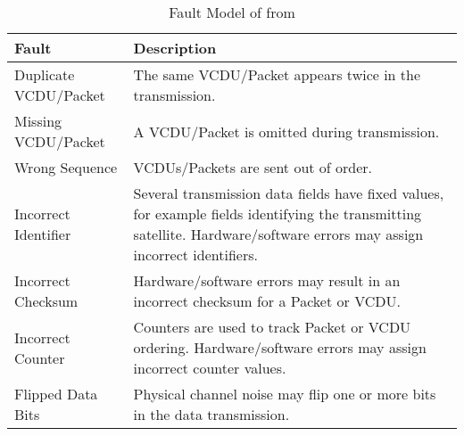 \begin{table}[h]
\begin{center}
\tiny
\begin{tabular}{|p{2.5cm}|p{5.3cm}|}
\hline
\textbf{Fault}&\textbf{Description}\\
\hline
Duplicate VCDU/Packet&The same VCDU/Packet appears twice in the transmission.\\
Missing VCDU/Packet& A VCDU/Packet is omitted during transmission.\\
Wrong Sequence& VCDUs/Packets are sent out of order. \\
Incorrect Identifier& Several transmission data fields have fixed values, for example fields identifying the transmitting satellite. Hardware/software errors may assign incorrect identifiers.\\
Incorrect Checksum& Hardware/software errors may result in an incorrect checksum for a Packet or VCDU.\\
Incorrect Counter& Counters are used to track Packet or VCDU ordering. Hardware/software errors may assign incorrect counter values.\\
Flipped Data Bits& Physical channel noise may flip one or more bits in the data transmission.\\
\hline
\end{tabular}
\end{center}
\caption{Fault Model of from \cite{di2015generating}}
\label{table:faultModel:SES}
\end{table}%